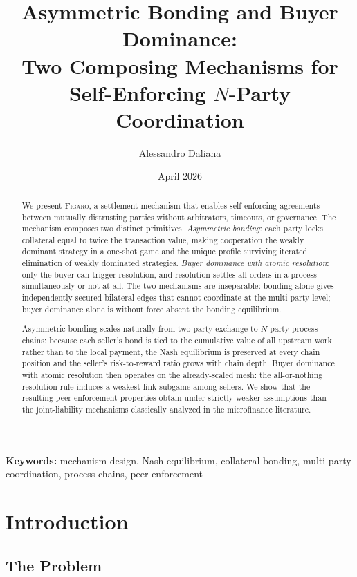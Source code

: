\documentclass[11pt,a4paper]{article}
\title{%
  Asymmetric Bonding and Buyer Dominance:\\
  Two Composing Mechanisms for Self-Enforcing $N$-Party Coordination%
}
\author{
  Alessandro Daliana
}
\date{April 2026}
\theoremstyle{definition}
\theoremstyle{remark}
\newcommand{\figaro}{\textsc{Figaro}}
\begin{document}
\maketitle

\begin{abstract}
We present \figaro, a settlement mechanism that enables self-enforcing
agreements between mutually distrusting parties without arbitrators,
timeouts, or governance. The mechanism composes two distinct primitives.
\emph{Asymmetric bonding}: each party locks collateral equal to twice
the transaction value, making cooperation the weakly dominant strategy
in a one-shot game and the unique profile surviving iterated
elimination of weakly dominated strategies. \emph{Buyer dominance
with atomic resolution}: only the buyer can trigger resolution, and
resolution settles all orders in a process simultaneously or not at
all. The two mechanisms are inseparable: bonding alone gives
independently secured bilateral edges that cannot coordinate at the
multi-party level; buyer dominance alone is without force absent the
bonding equilibrium.

Asymmetric bonding scales naturally from two-party exchange to
$N$-party process chains: because each seller's bond is tied to the
cumulative value of all upstream work rather than to the local
payment, the Nash equilibrium is preserved at every chain position
and the seller's risk-to-reward ratio grows with chain depth. Buyer
dominance with atomic resolution then operates on the already-scaled
mesh: the all-or-nothing resolution rule induces a weakest-link
subgame among sellers. We show that the resulting peer-enforcement
properties obtain under strictly weaker assumptions than the
joint-liability mechanisms classically analyzed in the microfinance
literature.
\end{abstract}

\medskip
\noindent\textbf{Keywords:}
mechanism design, Nash equilibrium, collateral bonding,
multi-party coordination, process chains, peer enforcement

\section{Introduction}
\label{sec:intro}

\subsection{The Problem}
\end{document}
